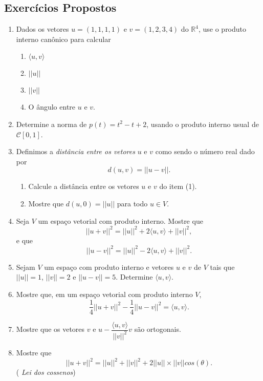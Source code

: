 \subsection{Exercícios Propostos}
\begin{enumerate}

\item Dados os vetores $u=(1,1,1,1)$ e $v=(1, 2, 3, 4)$ do $\mathbb{R}^4$, use o produto interno canônico para calcular
\begin{enumerate}%
\item $\langle u, v \rangle$
\item  $||u||$
\item  $||v||$
\item O ângulo entre $u$ e $v$.
\end{enumerate}

\item Determine a norma de $p(t)=t^2-t +2$, usando o produto interno usual de $\mathcal{C}[0,1]$.
\item Definimos a \textit{distância entre os vetores} $u$ e $v$ como sendo o número real dado por $$d(u,v)=||u-v||.$$

\begin{enumerate}%
\item Calcule a distância entre os vetores $u$ e $v$ do item (1).
\item Mostre que $d(u,0)=||u||$ para todo $ u \in V$.
\end{enumerate}
\item Seja  $V$ um espaço vetorial  com produto interno. Mostre que $$||u+v||^2=||u||^2+2\langle u, v \rangle+ ||v||^2, $$ e  que $$||u-v||^2=||u||^2-2\langle u, v \rangle+ ||v||^2.$$

\item Sejam  $V$ um espaço com produto interno e vetores $u$ e $v$ de $V$ tais que $||u||=1$,  $||v||=2$ e $||u-v||=5$. Determine $\langle u, v \rangle$.

\item Mostre que, em um espaço vetorial com produto interno $V$,   $$\dfrac{1}{4}||u+v||^2- \dfrac{1}{4}||u-v||^2=\langle u, v \rangle.$$

\item Mostre que os vetores $v$ e $u-\dfrac{\langle u, v \rangle}{||v||^2}v$ são ortogonais.

\item Mostre que $$||u+v||^2=||u||^2+||v||^2 + 2||u||\times ||v|| cos(\theta). $$  ( \textit{Lei dos cossenos})


\end{enumerate}
